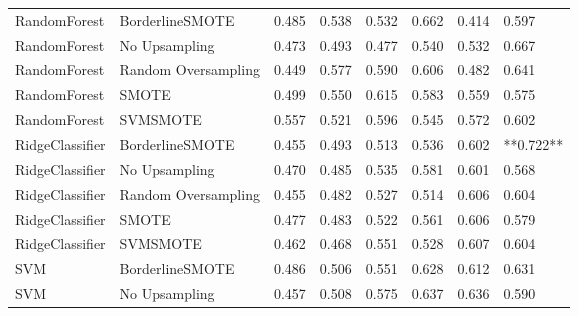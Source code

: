 \begin{tabular}{llllllll}
                RandomForest &     BorderlineSMOTE & 0.485 &                     0.538 &                 0.532 &                  0.662 &                                   0.414 &     0.597 \\
                RandomForest &       No Upsampling & 0.473 &                     0.493 &                 0.477 &                  0.540 &                                   0.532 &     0.667 \\
                RandomForest & Random Oversampling & 0.449 &                     0.577 &                 0.590 &                  0.606 &                                   0.482 &     0.641 \\
                RandomForest &               SMOTE & 0.499 &                     0.550 &                 0.615 &                  0.583 &                                   0.559 &     0.575 \\
                RandomForest &            SVMSMOTE & 0.557 &                     0.521 &                 0.596 &                  0.545 &                                   0.572 &     0.602 \\
             RidgeClassifier &     BorderlineSMOTE & 0.455 &                     0.493 &                 0.513 &                  0.536 &                                   0.602 & **0.722** \\
             RidgeClassifier &       No Upsampling & 0.470 &                     0.485 &                 0.535 &                  0.581 &                                   0.601 &     0.568 \\
             RidgeClassifier & Random Oversampling & 0.455 &                     0.482 &                 0.527 &                  0.514 &                                   0.606 &     0.604 \\
             RidgeClassifier &               SMOTE & 0.477 &                     0.483 &                 0.522 &                  0.561 &                                   0.606 &     0.579 \\
             RidgeClassifier &            SVMSMOTE & 0.462 &                     0.468 &                 0.551 &                  0.528 &                                   0.607 &     0.604 \\
                         SVM &     BorderlineSMOTE & 0.486 &                     0.506 &                 0.551 &                  0.628 &                                   0.612 &     0.631 \\
                         SVM &       No Upsampling & 0.457 &                     0.508 &                 0.575 &                  0.637 &                                   0.636 &     0.590 \\

\end{tabular}
